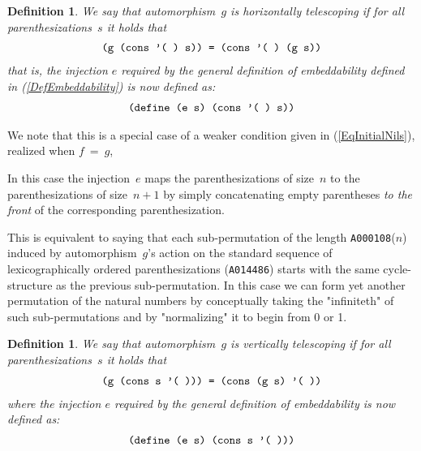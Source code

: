 \documentclass[11pt]{article} %
\newcommand{\eqn}[1]{(\ref{#1})}
\newcommand{\eeq}{\end{equation}}
\newcommand{\beql}[1]{\begin{equation}\label{#1}}
\newcommand{\autletter}[1]{$#1$}
\newcommand{\automorphismlet}[1]{automorphism~\autletter{#1}}
\newcommand{\EISseq}[1]{{\tt #1}}
\newcommand{\scmcode}[1]{{\tt{#1}}}
\newtheorem{definition}[theorem]{Definition}
\newenvironment{scmdefinefun}{\begin{tabular}{l l l p{5cm}}}{\end{tabular}}
\begin{document}
\begin{definition} %
\normalfont
We say that \automorphismlet{g} is {\em horizontally telescoping}
if for all parenthesizations~$s$ it holds that
\beql{EqHorizontallyTelescoping}
\begin{scmdefinefun}
\scmcode{(g (cons '( ) s)) = (cons '( ) (g  s))}
\end{scmdefinefun}
\eeq
that is, the injection $e$ required by the general definition of
embeddability defined in \eqn{DefEmbeddability}
is now defined as:
\beql{ConsNil2Front}
\begin{scmdefinefun}
\scmcode{(define (e s)  (cons '( ) s))}
\end{scmdefinefun}
\eeq

\end{definition}

We note that this is a special case of a weaker condition
given in \eqn{EqInitialNils}, realized when $f~=~g$,

In this case the injection~$e$  maps the parenthesizations of size~$n$
to the parenthesizations of size~$n+1$ by simply concatenating empty
parentheses {\em to the front}
of the corresponding parenthesization.

This is equivalent to saying that each sub-permutation of the length
\EISseq{A000108}($n$)
induced by \automorphismlet{g}'s action on
the standard sequence of lexicographically ordered parenthesizations
(\EISseq{A014486})
starts with the same cycle-structure as the previous sub-permutation.
In this case we can form yet another permutation of the natural numbers
by conceptually taking the "infiniteth" of such sub-permutations
and by "normalizing" it to begin from 0 or 1.


\begin{definition} %
\normalfont
We say that \automorphismlet{g} is {\em vertically telescoping}
if for all parenthesizations~$s$ it holds that
\beql{EqVerticallyTelescoping}
\begin{scmdefinefun}
\scmcode{(g (cons s '( ))) = (cons (g  s) '( ))}
\end{scmdefinefun}
\eeq
where the injection $e$ required by the general definition of
embeddability %
is now defined as:
\beql{ConsNil2Right}
\begin{scmdefinefun}
\scmcode{(define (e s)  (cons s '( )))}
\end{scmdefinefun}
\eeq

\end{definition}
\end{document}

